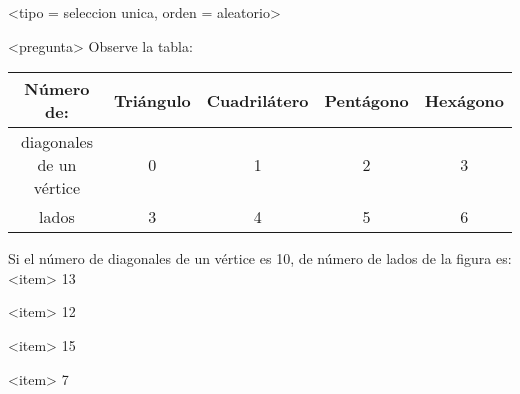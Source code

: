 <tipo = seleccion unica, orden = aleatorio>

<pregunta>
Observe la tabla:
\begin{center}
\begin{tabular}{ccccc} \toprule
Número de: & Triángulo & Cuadrilátero & Pentágono & Hexágono \\ \midrule
diagonales de un vértice & 0 & 1 & 2 & 3 \\
lados & 3  & 4 & 5 & 6 \\ \bottomrule
\end{tabular}
\end{center}
Si el número de diagonales de un vértice es 10, de número de lados de la figura es: \\[1ex]

<item>
13

<item>
12

<item>
15

<item>
7

